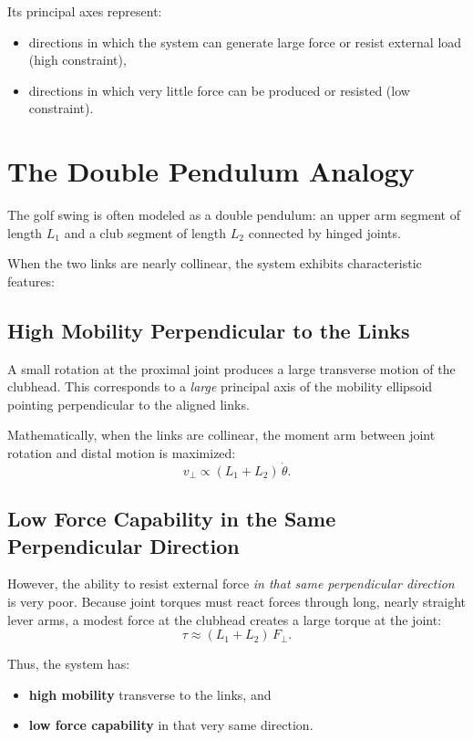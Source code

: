 \documentclass[12pt]{article}
\begin{document}
Its principal axes represent:
\begin{itemize}
    \item directions in which the system can generate large force or resist 
    external load (high constraint),
    \item directions in which very little force can be produced or resisted 
    (low constraint).
\end{itemize}

\section{The Double Pendulum Analogy}

The golf swing is often modeled as a double pendulum: an upper arm segment of 
length $L_1$ and a club segment of length $L_2$ connected by hinged joints.

When the two links are nearly collinear, the system exhibits characteristic 
features:

\subsection{High Mobility Perpendicular to the Links}

A small rotation at the proximal joint produces a large transverse motion of the 
clubhead.  
This corresponds to a \emph{large} principal axis of the mobility ellipsoid 
pointing perpendicular to the aligned links.

Mathematically, when the links are collinear, the moment arm between joint 
rotation and distal motion is maximized:
\[
    v_\perp \propto (L_1 + L_2)\, \dot{\theta}.
\]

\subsection{Low Force Capability in the Same Perpendicular Direction}

However, the ability to resist external force \emph{in that same perpendicular 
direction} is very poor.  
Because joint torques must react forces through long, nearly straight lever arms, 
a modest force at the clubhead creates a large torque at the joint:
\[
    \tau \approx (L_1 + L_2)\, F_\perp.
\]

Thus, the system has:
\begin{itemize}
    \item \textbf{high mobility} transverse to the links, and
    \item \textbf{low force capability} in that very same direction.
\end{itemize}
\end{document}
